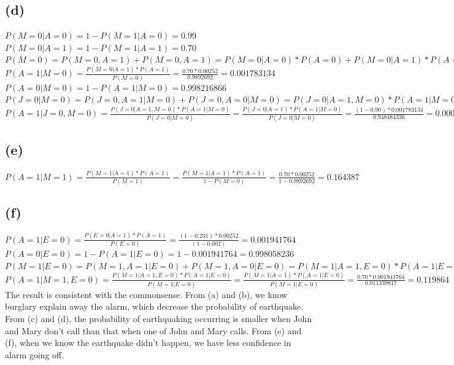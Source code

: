 \documentclass [11pt, a4paper, oneside] {article}
\begin{document}
\subsection *{(d)}
$P(M=0|A=0) = 1 - P(M=1|A=0) = 0.99$\\
$P(M=0|A=1) = 1 - P(M=1|A=1) = 0.70$\\
$P(M=0) = P(M=0, A=1) + P(M=0, A=1) = P(M=0|A=0)*P(A=0) + P(M=0|A=1)*P(A=1) = 0.99*0.99748 + 0.70*0.00252 = 0.9892692$\\
$P(A=1|M=0) = \frac{P(M=0|A=1)*P(A=1)}{P(M=0)} = \frac{0.70*0.00252}{0.9892692} = 0.001783134$\\
$P(A=0|M=0) = 1 - P(A=1|M=0) = 0.998216866$\\
$P(J=0|M=0) = P(J=0, A=1|M=0) + P(J=0, A=0|M=0) = P(J=0|A=1, M=0)*P(A=1|M=0) + P(J=0|A=0, M=0)*P(A=0|M=0) = P(J=0|A=1)*P(A=1|M=0) + P(J=0|A=0)*P(A=0|M=0)=
(1-0.90)*0.001783134 + (1-0.05)*0.998216866 = 0.948484336$\\
$P(A=1|J=0, M=0) = \frac{P(J=0|A=1, M=0)*P(A=1|M=0)}{P(J=0|M=0)} = \frac{P(J=0|A=1)*P(A=1|M=0)}{P(J=0|M=0)} = \frac{(1-0.90)*0.001783134}{0.948484336} = 0.000188$\\
\subsection *{(e)}
$P(A=1|M=1) = \frac{P(M=1|A=1)*P(A=1)}{P(M=1)} = \frac{P(M=1|A=1)*P(A=1)}{1 - P(M=0)} = \frac{0.70*0.00252}{1-0.9892692} = 0.164387$\\
\subsection *{(f)}
$P(A=1|E=0) = \frac{P(E=0|A=1)*P(A=1)}{P(E=0)} = \frac{(1-0.231)*0.00252}{(1-0.002)} = 0.001941764$\\
$P(A=0|E=0) = 1 - P(A=1|E=0) = 1 - 0.001941764 = 0.998058236$\\
$P(M=1|E=0) = P(M=1, A=1|E=0) + P(M=1, A=0|E=0) = P(M=1|A=1, E=0)*P(A=1|E=0) + P(M=1|A=0, E=0)*P(A=0|E=0) = P(M=1|A=1)*P(A=1|E=0) + P(M=1|A=0)*P(A=0|E=0) = 
0.70*0.001941764 + 0.01*0.998058236 = 0.011339817$\\
$P(A=1|M=1, E=0) = \frac{P(M=1|A=1, E=0)*P(A=1|E=0)}{P(M=1|E=0)} = \frac{P(M=1|A=1)*P(A=1|E=0)}{P(M=1|E=0)} = \frac{0.70*0.001941764}{0.011339817} = 0.119864$\\

The result is consistent with the commonsense. From (a) and (b), we know burglary explain away the alarm, which decrease the probability of earthquake. From (c) and (d),  the probability of earthquaking occurring is smaller when John and Mary don't call than that when one of John and Mary calls. From (e) and (f), when we know the earthquake didn't happen, we have less confidence in alarm going off. 
\end{document}
